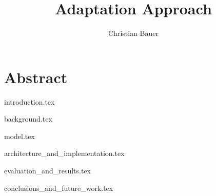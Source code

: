 \documentclass{memoir}
\title{Adaptation Approach}
\author{Christian Bauer}
\begin{document}
  \maketitle

  \tableofcontents
  \listoffigures
  

  \section*{Abstract}   

  {introduction.tex}

  {background.tex}

  {model.tex}

  {architecture_and_implementation.tex}
  
  {evaluation_and_results.tex}

  {conclusions_and_future_work.tex}


  
  
\end{document}

